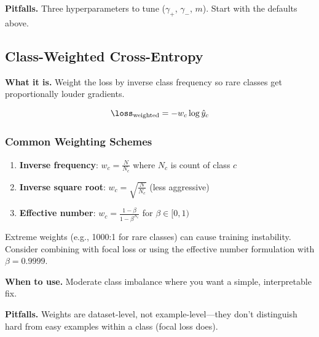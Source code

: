 \textbf{Pitfalls.} Three hyperparameters to tune ($\gamma_+$, $\gamma_-$, $m$). Start with the defaults above.

\subsection{Class-Weighted Cross-Entropy}

\textbf{What it is.} Weight the loss by inverse class frequency so rare classes get proportionally louder gradients.

\begin{equation}
\loss_{\text{weighted}} = -w_c \log\hat{y}_c
\end{equation}

\subsubsection{Common Weighting Schemes}

\begin{enumerate}
    \item \textbf{Inverse frequency}: $w_c = \frac{N}{N_c}$ where $N_c$ is count of class $c$

    \item \textbf{Inverse square root}: $w_c = \sqrt{\frac{N}{N_c}}$ (less aggressive)

    \item \textbf{Effective number}: $w_c = \frac{1-\beta}{1-\beta^{N_c}}$ for $\beta \in [0,1)$
\end{enumerate}

\begin{warningbox}
Extreme weights (e.g., 1000:1 for rare classes) can cause training instability. Consider combining with focal loss or using the effective number formulation with $\beta = 0.9999$.
\end{warningbox}

\textbf{When to use.} Moderate class imbalance where you want a simple, interpretable fix.

\textbf{Pitfalls.} Weights are dataset-level, not example-level---they don't distinguish hard from easy examples within a class (focal loss does).

